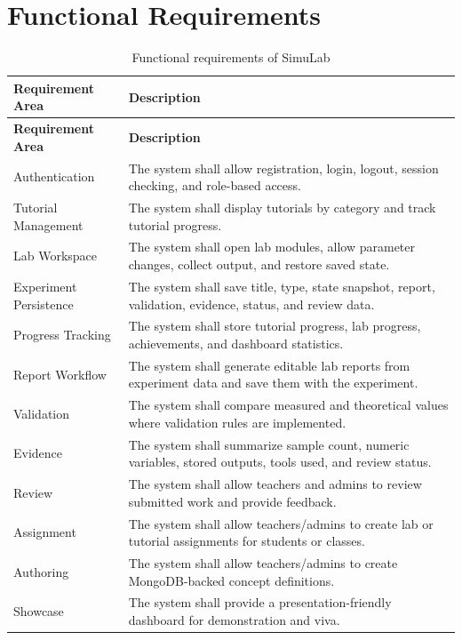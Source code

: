\documentclass[12pt,a4paper]{report}
\begin{document}
\section{Functional Requirements}
\begin{longtable}{p{} p{}}
\caption{Functional requirements of SimuLab}\\
\toprule
\textbf{Requirement Area} & \textbf{Description} \\
\midrule
\endfirsthead
\toprule
\textbf{Requirement Area} & \textbf{Description} \\
\midrule
\endhead
Authentication & The system shall allow registration, login, logout, session checking, and role-based access. \\
Tutorial Management & The system shall display tutorials by category and track tutorial progress. \\
Lab Workspace & The system shall open lab modules, allow parameter changes, collect output, and restore saved state. \\
Experiment Persistence & The system shall save title, type, state snapshot, report, validation, evidence, status, and review data. \\
Progress Tracking & The system shall store tutorial progress, lab progress, achievements, and dashboard statistics. \\
Report Workflow & The system shall generate editable lab reports from experiment data and save them with the experiment. \\
Validation & The system shall compare measured and theoretical values where validation rules are implemented. \\
Evidence & The system shall summarize sample count, numeric variables, stored outputs, tools used, and review status. \\
Review & The system shall allow teachers and admins to review submitted work and provide feedback. \\
Assignment & The system shall allow teachers/admins to create lab or tutorial assignments for students or classes. \\
Authoring & The system shall allow teachers/admins to create MongoDB-backed concept definitions. \\
Showcase & The system shall provide a presentation-friendly dashboard for demonstration and viva. \\
\bottomrule
\end{longtable}
\end{document}
